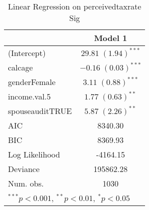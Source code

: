 
\begin{table}
\begin{tabular}{l c }
\hline
 & Model 1 \\
\hline
(Intercept)     & $29.81 \; (1.94)^{***}$ \\
calcage         & $-0.16 \; (0.03)^{***}$ \\
genderFemale    & $3.11 \; (0.88)^{***}$  \\
income.val.5    & $1.77 \; (0.63)^{**}$   \\
spouseauditTRUE & $5.87 \; (2.26)^{**}$   \\
\hline
AIC             & 8340.30                 \\
BIC             & 8369.93                 \\
Log Likelihood  & -4164.15                \\
Deviance        & 195862.28               \\
Num. obs.       & 1030                    \\
\hline
\multicolumn{2}{l}{\scriptsize{$^{***}p<0.001$, $^{**}p<0.01$, $^*p<0.05$}}
\end{tabular}
\caption{Linear Regression on perceivedtaxrate Sig}
\label{table:coefficients}
\end{table}
